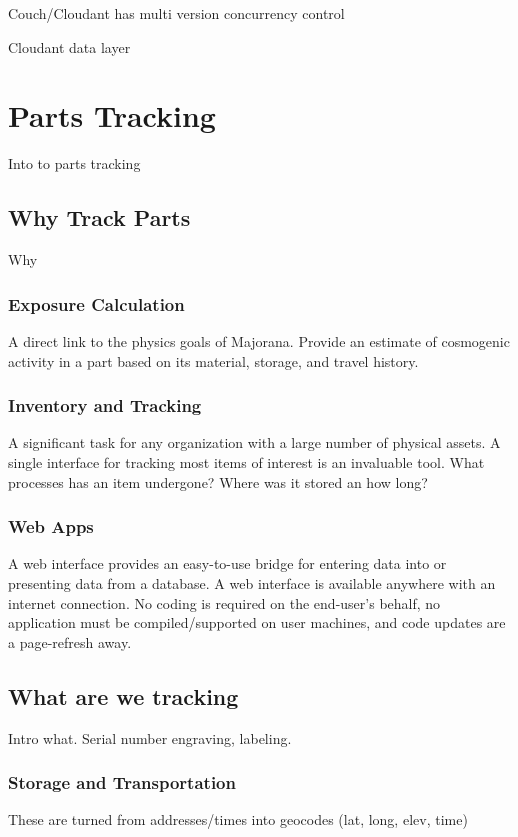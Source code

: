 \documentclass[journal]{IEEEtran}
\begin{document}
Couch/Cloudant has multi version concurrency control

Cloudant data layer

\section{Parts Tracking}
Into to parts tracking

\subsection{Why Track Parts}
Why

\subsubsection{Exposure Calculation}
A direct link to the physics goals of Majorana. Provide an estimate of cosmogenic activity in a part based on its material, storage, and travel history.

\subsubsection{Inventory and Tracking}
A significant task for any organization with a large number of physical assets. A single interface for tracking most items of interest is an invaluable tool. What processes has an item undergone? Where was it stored an how long?

\subsubsection{Web Apps}
A web interface provides an easy-to-use bridge for entering data into or presenting data from a database. A web interface is available anywhere with an internet connection. No coding is required on the end-user's behalf, no application must be compiled/supported on user machines, and code updates are a page-refresh away.

\subsection{What are we tracking}
Intro what. Serial number engraving, labeling.

\subsubsection{Storage and Transportation}
These are turned from addresses/times into geocodes (lat, long, elev, time)
\end{document}
